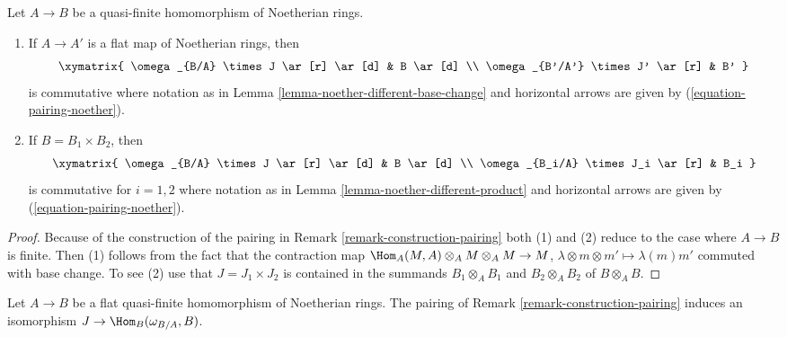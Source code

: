 \begin{lemma}
\label{lemma-noether-pairing-compatibilities}
Let $A \to B$ be a quasi-finite homomorphism of Noetherian rings.
\begin{enumerate}
\item If $A \to A'$ is a flat map of Noetherian rings, then
$$
\xymatrix{
\omega_{B/A} \times J \ar[r] \ar[d] & B \ar[d]  \\
\omega_{B'/A'} \times J' \ar[r] & B'
}
$$
is commutative where notation as in
Lemma \ref{lemma-noether-different-base-change}
and horizontal arrows are given by
(\ref{equation-pairing-noether}).
\item If $B = B_1 \times B_2$, then
$$
\xymatrix{
\omega_{B/A} \times J \ar[r] \ar[d] & B \ar[d]  \\
\omega_{B_i/A} \times J_i \ar[r] & B_i
}
$$
is commutative for $i = 1, 2$ where notation as in
Lemma \ref{lemma-noether-different-product}
and horizontal arrows are given by
(\ref{equation-pairing-noether}).
\end{enumerate}
\end{lemma}

\begin{proof}
Because of the construction of the pairing in
Remark \ref{remark-construction-pairing}
both (1) and (2) reduce to the case where $A \to B$ is finite.
Then (1) follows from the fact that the contraction map
$\Hom_A(M, A) \otimes_A M \otimes_A M \to M$,
$\lambda \otimes m \otimes m' \mapsto \lambda(m)m'$
commuted with base change. To see (2) use that
$J = J_1 \times J_2$ is contained in the summands
$B_1 \otimes_A B_1$ and $B_2 \otimes_A B_2$
of $B \otimes_A B$.
\end{proof}

\begin{lemma}
\label{lemma-noether-pairing-flat-quasi-finite}
Let $A \to B$ be a flat quasi-finite homomorphism of Noetherian rings.
The pairing of Remark \ref{remark-construction-pairing} induces an isomorphism
$J \to \Hom_B(\omega_{B/A}, B)$.
\end{lemma}

